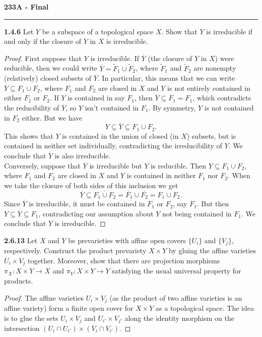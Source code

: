 \documentclass[11pt,letterpaper]{report}
\begin{document}
\begin{center}
{\bf \Large 233A - Final} %
\vspace{0.2cm}
\hrule
\end{center}

\noindent\textbf{1.4.6}
Let $Y$ be a subspace of a topological space $X$. Show that $Y$ is irreducible if and only if the closure of $Y$ in $X$ is irreducible.
\begin{proof}
	First suppose that $Y$ is irreducible. If $\overline{Y}$ (the closure of $Y$ in $X$) were reducible, then we could write $\overline{Y} = \tilde{F}_1\cup \tilde{F}_2$, where $\tilde{F}_1$ and $\tilde{F}_2$ are nonempty (relatively) closed subsets of $\overline{Y}$. In particular, this means that we can write $\overline{Y}\subseteq F_1\cup F_2$, where $F_1$ and $F_2$ are closed in $X$ and $Y$ is not entirely contained in either $F_1$ or $F_2$. If $Y$ is contained in say $F_1$, then $\overline{Y}\subseteq \overline{F}_1 = F_1$, which contradicts the reducibility of $\overline{Y}$, so $Y$ isn't contained in $F_1$. By symmetry, $Y$ is not contained in $F_2$ either. But we have
	\[
	Y\subseteq \overline{Y}\subseteq F_1\cup F_2.
	\]
	This shows that $Y$ is contained in the union of closed (in $X$) subsets, but is contained in neither set individually, contradicting the irreducibility of $Y$. We conclude that $\overline{Y}$ is also irreducible.\\

	\noindent Conversely, suppose that $\overline{Y}$ is irreducible but $Y$ is reducible. Then $Y\subseteq F_1\cup F_2$, where $F_1$ and $F_2$ are closed in $X$ and $Y$ is contained in neither $F_1$ nor $F_2$. When we take the closure of both sides of this inclusion we get
	\[
	\overline{Y}\subseteq \overline{F_1\cup F_2} = \overline{F_1}\cup \overline{F_2} = F_1\cup F_2.
	\]
	Since $\overline{Y}$ is irreducible, it must be contained in $F_1$ or $F_2$, say $F_1$. But then $Y\subseteq \overline{Y}\subseteq F_1$, contradicting our assumption about $Y$ not being contained in $F_1$. We conclude that $Y$ is irreducible.
\end{proof}

\noindent\textbf{2.6.13}
Let $X$ and $Y$ be prevarieties with affine open covers $\{U_i\}$ and $\{V_j\}$, respectively. Construct the product prevariety $X\times Y$ by gluing the affine varieties $U_i\times V_j$ together. Moreover, show that there are projection morphisms $\pi_X:X\times Y\to X$ and $\pi_Y:X\times Y\to Y$ satisfying the usual universal property for products.
\begin{proof}
	The affine varieties $U_i\times V_j$ (as the product of two affine varieties is an affine variety) form a finite open cover for $X\times Y$ as a topological space. The idea is to glue the sets $U_i\times V_j$ and $U_{i'}\times V_{j'}$ along the identity morphism on the intersection $(U_i\cap U_{i'})\times (V_i\cap V_{i'})$. 
\end{proof}
\end{document}
